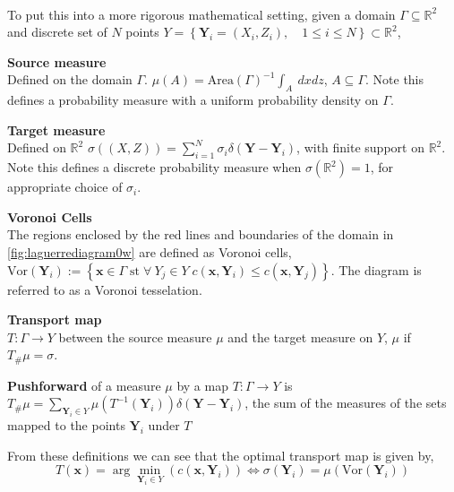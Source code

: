 \\
To put this into a more rigorous mathematical setting, given a domain  $\Gamma\subseteq \mathbb{R}^2$ and discrete set of $N$ points $Y = \left\lbrace \bm{Y}_i = (X_i,Z_i), \quad 1\leq i \leq N \right\rbrace  \subset \mathbb{R}^2$,
\begin{definition}
	\textbf{Source measure} \\ Defined on the domain $\Gamma$. $\mu(A) = \textrm{Area}(\Gamma)^{-1}\int_A \ dxdz$, $A \subseteq \Gamma$. Note this defines a probability measure with a uniform probability density on $\Gamma$.
\end{definition}
\begin{definition}
	\textbf{Target measure} \\Defined on $\mathbb{R}^2$ $\sigma((X,Z)) = \sum_{i=1}^{N}\sigma_i \delta\left(\bm{Y}-\bm{Y}_i\right)$, with finite support on $\mathbb{R}^2$. Note this defines a discrete probability measure when $\sigma(\mathbb{R}^2) = 1$, for appropriate choice of $\sigma_i$.
	\label{target measure}
\end{definition}
\begin{definition}
	\textbf{Voronoi Cells} \\ The regions enclosed by the red lines and boundaries of the domain in \ref{fig:laguerrediagram0w} are defined as Voronoi cells, $\text{Vor}(\bm{Y}_i) := \left\lbrace \bm{x} \in \Gamma \; \text{st} \; \forall \ Y_j \in Y \; c(\bm{x},\bm{Y}_i) \leq c(\bm{x},\bm{Y}_j) \right\rbrace$. The diagram is referred to as a Voronoi tesselation.
\end{definition} 
\begin{definition} 
	\textbf{Transport map} \\ $T: \Gamma \rightarrow Y$ between the source measure $\mu$ and the target measure on $Y$, $\mu$ if $T_{\#}\mu = \sigma$.\\
\end{definition}
\begin{definition}
	\textbf{Pushforward} of a measure $\mu$ by a map $T: \Gamma \rightarrow Y$ is $T_{\#}\mu = \sum_{\bm{Y}_i \in Y} \mu \left( T^{-1}(\bm{Y}_i) \right) \delta(\bm{Y}-{\bm{Y}_i})$, the sum of the measures of the sets mapped to the points $\bm{Y}_i$ under $T$
\end{definition}
From these definitions we can see that the optimal transport map is given by,
\begin{equation}
	T(\bm{x}) = \arg\min_{\bm{Y}_i\in Y}\left(c(\bm{x},\bm{Y}_i)\right) \iff \sigma(\bm{Y}_i) = \mu\left(\text{Vor}(\bm{Y}_i)\right)
\end{equation}

